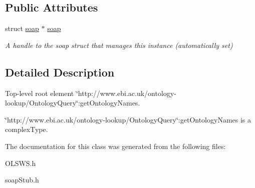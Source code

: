 \subsection*{Public Attributes}
\begin{DoxyCompactItemize}
\item 
\hypertarget{class__ns1____getOntologyNames_a592912fd75aa6c7384633251c401dbd6}{
struct \hyperlink{class__ns1____getOntologyNames_a592912fd75aa6c7384633251c401dbd6}{soap} $\ast$ \hyperlink{class__ns1____getOntologyNames_a592912fd75aa6c7384633251c401dbd6}{soap}}
\label{class__ns1____getOntologyNames_a592912fd75aa6c7384633251c401dbd6}

\begin{DoxyCompactList}\small\item\em A handle to the soap struct that manages this instance (automatically set) \end{DoxyCompactList}\end{DoxyCompactItemize}


\subsection{Detailed Description}
Top-\/level root element \char`\"{}http://www.ebi.ac.uk/ontology-\/lookup/OntologyQuery\char`\"{}:getOntologyNames. 

\char`\"{}http://www.ebi.ac.uk/ontology-\/lookup/OntologyQuery\char`\"{}:getOntologyNames is a complexType. 

The documentation for this class was generated from the following files:\begin{DoxyCompactItemize}
\item 
OLSWS.h\item 
soapStub.h\end{DoxyCompactItemize}
